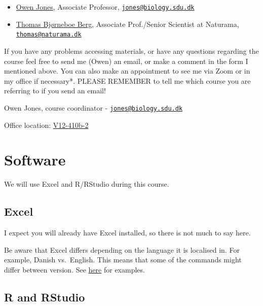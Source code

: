 \documentclass[
  a4paper]{book}
\providecommand{\tightlist}{%
  \setlength{\itemsep}{0pt}\setlength{\parskip}{0pt}}
\begin{document}
\begin{itemize}
\tightlist
\item
  \href{https://portal.findresearcher.sdu.dk/en/persons/jones}{Owen Jones}, Associate Professor, \href{mailto:jones@biology.sdu.dk}{\nolinkurl{jones@biology.sdu.dk}}
\item
  \href{https://portal.findresearcher.sdu.dk/en/persons/thomasbb}{Thomas Bjørneboe Berg}, Associate Prof./Senior Scientist at Naturama, \href{mailto:thomas@naturama.dk}{\nolinkurl{thomas@naturama.dk}}
\end{itemize}

If you have any problems accessing materials, or have any questions regarding the course feel free to send me (Owen) an email, or make a comment in the form I mentioned above. You can also make an appointment to see me via Zoom or in my office if necessary*. PLEASE REMEMBER to tell me which course you are referring to if you send an email!

Owen Jones, course coordinator - \href{mailto:jones@biology.sdu.dk}{\nolinkurl{jones@biology.sdu.dk}}

Office location: \href{https://clients.mapsindoors.com/sdu/573f26e4bc1f571b08094312/details/563cb94f423b7d0540c9a605}{V12-410b-2}

\hypertarget{software}{%
\section{Software}\label{software}}

We will use Excel and R/RStudio during this course.

\hypertarget{excel}{%
\subsection{Excel}\label{excel}}

I expect you will already have Excel installed, so there is not much to say here.

Be aware that Excel differs depending on the language it is localised in. For example, Danish vs.~English. This means that some of the commands might differ between version.
See \href{https://easy-excel.com/excel-in-other-languages/excel-formulas-in-danish/}{here} for examples.

\hypertarget{r-and-rstudio}{%
\subsection{R and RStudio}\label{r-and-rstudio}}
\end{document}
